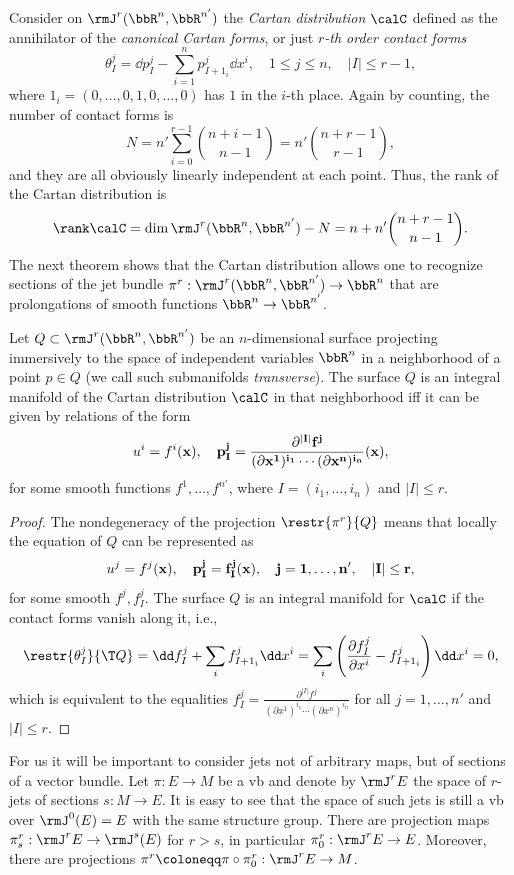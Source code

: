 Consider on $\rmJ^r(\bbR^n,\bbR^{n'})$ the \emph{Cartan distribution} $\calC$ defined as the annihilator of the \emph{canonical Cartan forms}, or just \emph{$r$-th order contact forms} 
\[\theta^j_I=\dd p^j_I-\sum_{i=1}^n p^j_{I+1_i}\dd x^i,\quad 1\leq j\leq n,\quad |I|\leq r-1,\]
where $1_i=(0,\ldots,0,1,0,\ldots,0)$ has $1$ in the $i$-th place. Again by counting, the number of contact forms is 
\[N=n'\sum_{i=0}^{r-1}\binom{n+i-1}{n-1}=n'\binom{n+r-1}{r-1},\]
and they are all obviously linearly independent at each point. Thus, the rank of the Cartan distribution is
\[\rank\calC=\dim\rmJ^r(\bbR^n,\bbR^{n'})-N=n+n'\binom{n+r-1}{n-1}.\]
The next theorem shows that the Cartan distribution allows one to recognize sections of the jet bundle $\pi^r:\rmJ^r(\bbR^n,\bbR^{n'})\to \bbR^n$ that are prolongations of smooth functions $\bbR^n\to \bbR^{n'}$.

\begin{thm}\label{thm 3.1.1 Kras}
    Let $Q\subset\rmJ^r(\bbR^n,\bbR^{n'})$ be an $n$-dimensional surface projecting immersively to the space of independent variables $\bbR^n$ in a neighborhood of a point $p\in Q$ (we call such submanifolds \emph{transverse}). The surface $Q$ is an integral manifold of the Cartan distribution $\calC$ in that neighborhood iff it can be given by relations of the form 
    \[u^i=f^i(\bf{x}),\quad p^j_I=\frac{\partial^{|I|}f^j}{(\partial x^1)^{i_1}\cdots (\partial x^n)^{i_n}}(\bf{x}),\]
    for some smooth functions $f^1,\ldots,f^{n'}$, where $I=(i_1,\ldots,i_n)$ and $|I|\leq r$.
\end{thm}
\begin{proof}
    The nondegeneracy of the projection $\restr{\pi^r}{Q}$ means that locally the equation of $Q$ can be represented as 
    \[u^j=f^j(\bf{x}),\quad p^j_I=f^j_I(\bf{x}),\quad j=1,\ldots,n',\quad |I|\leq r,\]
    for some smooth $f^j,f^j_I$. The surface $Q$ is an integral manifold for $\calC$ if the contact forms vanish along it, i.e., 
    \[\restr{\theta^j_I}{\T Q}=\dd f^j_I+\sum_i f^j_{I+1_i}\dd x^i=\sum_i \left(\frac{\partial f^j_I}{\partial x^i}-f^j_{I+1_i}\right)\dd x^i=0,\]
    which is equivalent to the equalities $f^j_I=\frac{\partial^{|I|}f^j}{(\partial x^1)^{i_1}\cdots(\partial x^n)^{i_n}}$ for all $j=1,\ldots,n'$ and $|I|\leq r$.
\end{proof}

For us it will be important to consider jets not of arbitrary maps, but of sections of a vector bundle. Let $\pi:E\to M$ be a \gls{vb} and denote by $\rmJ^rE$ the space of $r$-jets of sections $s:M\to E$. It is easy to see that the space of such jets is still a \gls{vb} over $\rmJ^0(E)=E$ with the same structure group. There are projection maps $\pi^r_s:\rmJ^rE\to \rmJ^s(E)$ for $r>s$, in particular $\pi^r_0:\rmJ^rE\to E$. Moreover, there are projections $\pi^r\coloneqq \pi\circ \pi^r_0:\rmJ^rE\to M$.

